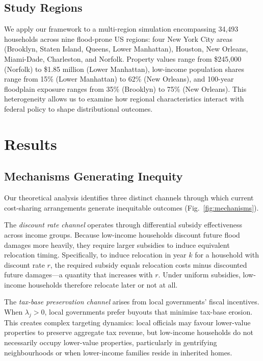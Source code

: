 \documentclass[12pt,a4paper]{article}
\begin{document}
\subsection{Study Regions}

We apply our framework to a multi-region simulation encompassing 34,493 households across nine flood-prone US regions: four New York City areas (Brooklyn, Staten Island, Queens, Lower Manhattan), Houston, New Orleans, Miami-Dade, Charleston, and Norfolk. Property values range from \$245,000 (Norfolk) to \$1.85 million (Lower Manhattan), low-income population shares range from 15\% (Lower Manhattan) to 62\% (New Orleans), and 100-year floodplain exposure ranges from 35\% (Brooklyn) to 75\% (New Orleans). This heterogeneity allows us to examine how regional characteristics interact with federal policy to shape distributional outcomes.


\section{Results}\label{sec:results}

\subsection{Mechanisms Generating Inequity}

Our theoretical analysis identifies three distinct channels through which current cost-sharing arrangements generate inequitable outcomes (Fig.~\ref{fig:mechanisms}).

The \textit{discount rate channel} operates through differential subsidy effectiveness across income groups. Because low-income households discount future flood damages more heavily, they require larger subsidies to induce equivalent relocation timing. Specifically, to induce relocation in year $k$ for a household with discount rate $r$, the required subsidy equals relocation costs minus discounted future damages---a quantity that increases with $r$. Under uniform subsidies, low-income households therefore relocate later or not at all.

The \textit{tax-base preservation channel} arises from local governments' fiscal incentives. When $\lambda_j > 0$, local governments prefer buyouts that minimise tax-base erosion. This creates complex targeting dynamics: local officials may favour lower-value properties to preserve aggregate tax revenue, but low-income households do not necessarily occupy lower-value properties, particularly in gentrifying neighbourhoods or when lower-income families reside in inherited homes.
\end{document}
